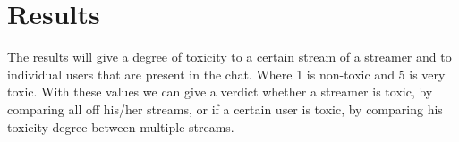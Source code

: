 \documentclass[final]{report}
\begin{document}
\chapter{Results}
\label{ch:results}

The results will give a degree of toxicity to a certain stream of a streamer and to individual users that are present in the chat.
Where 1 is non-toxic and 5 is very toxic.
With these values we can give a verdict whether a streamer is toxic, by comparing all off his/her streams, or if a certain user is toxic, by comparing his toxicity degree between multiple streams.
\end{document}
